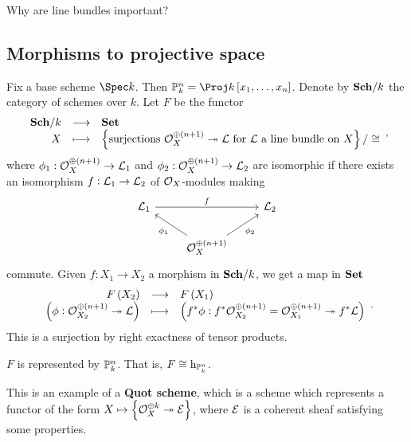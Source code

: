 Why are line bundles important?

\subsection{Morphisms to projective space}

Fix a base scheme $ \Spec k $. Then $ \PP_k^n = \Proj k\sbr{x_1, \dots, x_n} $. Denote by $ \textbf{Sch} / k $ the category of schemes over $ k $. Let $ F $ be the functor
$$ \function{\Sch / k}{\Set}{X}{\cbr{\text{surjections} \ \OOO_X^{\oplus \br{n + 1}} \twoheadrightarrow \LLL \ \text{for} \ \LLL \ \text{a line bundle on} \ X} / \cong}, $$
where $ \phi_1 : \OOO_X^{\oplus \br{n + 1}} \to \LLL_1 $ and $ \phi_2 : \OOO_X^{\oplus \br{n + 1}} \to \LLL_2 $ are isomorphic if there exists an isomorphism $ f : \mathcal{L}_1 \to \mathcal{L}_2 $ of $ \mathcal{O}_X $-modules making
$$
\begin{tikzcd}
\LLL_1 \arrow{rr}{f} & & \LLL_2 \\
& \OOO_X^{\oplus \br{n + 1}} \arrow{ul}{\phi_1} \arrow{ur}[swap]{\phi_2} &
\end{tikzcd}
$$
commute. Given $ f : X_1 \to X_2 $ a morphism in $ \textbf{Sch} / k $, we get a map in $ \textbf{Set} $
$$ \function{F\br{X_2}}{F\br{X_1}}{\br{\phi : \OOO_{X_2}^{\oplus \br{n + 1}} \twoheadrightarrow \LLL}}{\br{f^*\phi : f^*\OOO_{X_2}^{\oplus \br{n + 1}} = \OOO_{X_1}^{\oplus \br{n + 1}} \twoheadrightarrow f^*\LLL}}. $$
This is a surjection by right exactness of tensor products.

\pagebreak

\begin{theorem}
$ F $ is represented by $ \mathbb{P}_k^n $. That is, $ F \cong \mathrm{h}_{\mathbb{P}_k^n} $.
\end{theorem}

\begin{remark*}
This is an example of a \textbf{Quot scheme}, which is a scheme which represents a functor of the form $ X \mapsto \cbr{\OOO_X^{\oplus k} \twoheadrightarrow \EEE} $, where $ \mathcal{E} $ is a coherent sheaf satisfying some properties.
\end{remark*}


